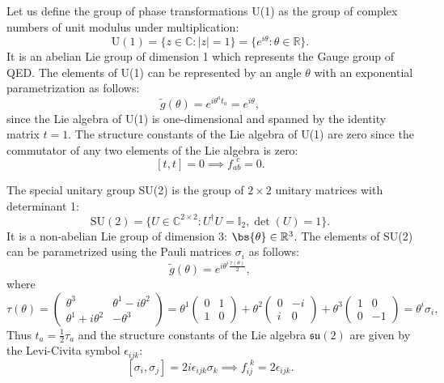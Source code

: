 \begin{example}
    Let us define the group of phase transformations U(1) as the group of complex numbers of unit modulus under multiplication:
    \[
        \mathrm{U}(1) = \{ z \in \mathbb{C} : |z| = 1 \} = \{ e^{i\theta} : \theta \in \mathbb{R} \}.
    \]
    It is an abelian Lie group of dimension 1 which represents the Gauge group of QED.
    The elements of U(1) can be represented by an angle \(\theta\) with an exponential parametrization as follows:
    \[
        \tilde{g}(\theta) = e^{i\theta^a t_a} = e^{i\theta},
    \]
    since the Lie algebra of U(1) is one-dimensional and spanned by the identity matrix \(t = 1\). The structure constants of the Lie algebra of U(1) are zero since the commutator of any two elements of the Lie algebra is zero:
    \[
        [t, t] = 0 \implies f_{ab}^{\ \ c} = 0.
    \]
\end{example}

\begin{example}
    The special unitary group SU(2) is the group of \(2 \times 2\) unitary matrices with determinant 1:
    \[
        \mathrm{SU}(2) = \{ U \in \mathbb{C}^{2 \times 2} : U^\dagger U = \mathbb{I}_2, \det(U) = 1 \}.
    \]
    It is a non-abelian Lie group of dimension 3: \(\bs{\theta} \in \mathbb{R}^3\). The elements of SU(2) can be parametrized using the Pauli matrices \(\sigma_i\) as follows:
    \[
        \tilde{g}(\theta) = e^{i \theta^i \frac{\tau(\theta)}{2}},
    \]
    where
    \[
        \tau(\theta) = \begin{pmatrix}
            \theta^3              & \theta^1 - i \theta^2 \\
            \theta^1 + i \theta^2 & -\theta^3
        \end{pmatrix} = \theta^1 \begin{pmatrix}
            0 & 1 \\
            1 & 0
        \end{pmatrix} + \theta^2 \begin{pmatrix}
            0 & -i \\
            i & 0
        \end{pmatrix} + \theta^3 \begin{pmatrix}
            1 & 0  \\
            0 & -1
        \end{pmatrix} = \theta^i \sigma_i,
    \]
    Thus \(t_a = \frac{1}{2}\tau_a\) and the structure constants of the Lie algebra \(\mathfrak{su}(2)\) are given by the Levi-Civita symbol \(\epsilon_{ijk}\):
    \[
        [\sigma_i, \sigma_j] = 2i \epsilon_{ijk} \sigma_k \implies f_{ij}^{\ \ k} = 2 \epsilon_{ijk}.
    \]
\end{example}

